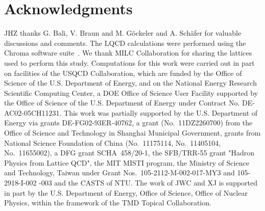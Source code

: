 \section*{Acknowledgments}

JHZ thanks G. Bali, V. Braun and M. G\"ockeler and A. Sch\"afer for valuable discussions and comments. The LQCD calculations were performed using the Chroma software
suite~\cite{Edwards:2004sx}. We thank MILC Collaboration for sharing the lattices used to perform this study. 
Computations for this work were carried out in part on facilities of the
USQCD Collaboration, which are funded by the Office of Science of the
U.S. Department of Energy, and on the National Energy Research Scientific Computing Center, a DOE Office of Science User Facility supported by the Office of Science of the U.S. Department of Energy under Contract No. DE-AC02-05CH11231.
This work was partially supported by the U.S. Department of Energy via grants DE-FG02-93ER-40762, a grant (No.~11DZ2260700) from the Office of Science and Technology in Shanghai Municipal Government, grants from National Science Foundation of China (No.~11175114, No.~11405104, No.~11655002), a DFG grant SCHA~458/20-1, the SFB/TRR-55 grant "Hadron Physics from Lattice QCD", the MIT MISTI program, the Ministry of Science and Technology, Taiwan under Grant Nos.~105-2112-M-002-017-MY3 and 105-2918-I-002 -003 and the CASTS of NTU. The work of JWC and XJ is supported in part by the U.S. Department of Energy, Office of Science, Office of Nuclear Physics, within the framework of the TMD Topical Collaboration.

